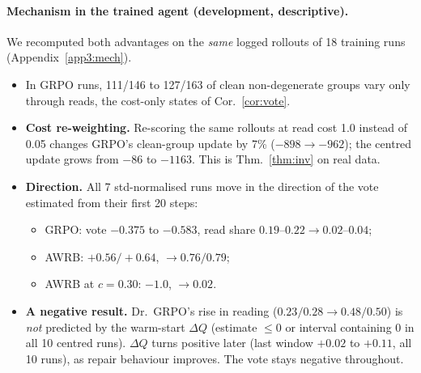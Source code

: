\documentclass[11pt]{article}
\begin{document}
\paragraph{Mechanism in the trained agent (development, descriptive).} We recomputed both advantages on the
\emph{same} logged rollouts of 18 training runs (Appendix~\ref{app3:mech}).
\begin{itemize}
\item In GRPO runs, 111/146 to 127/163 of clean non-degenerate groups vary only through reads, the cost-only states
of Cor.~\ref{cor:vote}.
\item \textbf{Cost re-weighting.} Re-scoring the same rollouts at read cost 1.0 instead of 0.05 changes GRPO's
clean-group update by 7\% ($-898\to-962$); the centred update grows from $-86$ to $-1163$. This is
Thm.~\ref{thm:inv} on real data.
\item \textbf{Direction.} All 7 std-normalised runs move in the direction of the vote estimated from their first 20
steps:
\begin{itemize}
\item GRPO: vote $-0.375$ to $-0.583$, read share $0.19$--$0.22\to0.02$--$0.04$;
\item AWRB: $+0.56/+0.64$, $\to0.76/0.79$;
\item AWRB at $c=0.30$: $-1.0$, $\to0.02$.
\end{itemize}
\item \textbf{A negative result.} Dr.~GRPO's rise in reading ($0.23/0.28\to0.48/0.50$) is \emph{not} predicted by
the warm-start $\Delta Q$ (estimate $\le0$ or interval containing 0 in all 10 centred runs). $\Delta Q$ turns
positive later (last window $+0.02$ to $+0.11$, all 10 runs), as repair behaviour improves. The vote stays negative
throughout.
\end{itemize}
\end{document}
